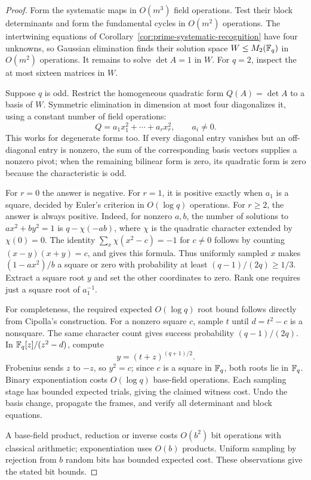 \begin{proof}
Form the systematic maps in \(O(m^3)\) field operations.  Test their block
determinants and form the fundamental cycles in \(O(m^2)\) operations.
The intertwining equations of Corollary~\ref{cor:prime-systematic-recognition}
have four unknowns, so Gaussian elimination finds their solution space
\(W\leq M_2(\mathbb F_q)\) in \(O(m^2)\) operations.  It remains to solve
\(\det A=1\) in \(W\).  For \(q=2\), inspect the at most sixteen matrices
in \(W\).

Suppose \(q\) is odd.  Restrict the homogeneous quadratic form
\(Q(A)=\det A\) to a basis of \(W\).  Symmetric elimination in dimension
at most four diagonalizes it, using a constant number of field operations:
\[
 Q= a_1x_1^2+\cdots+a_rx_r^2,\qquad a_i\ne0.
\]
This works for degenerate forms too.  If every diagonal entry vanishes but
an off-diagonal entry is nonzero, the sum of the corresponding basis
vectors supplies a nonzero pivot; when the remaining bilinear form is zero,
its quadratic form is zero because the characteristic is odd.

For \(r=0\) the answer is negative.  For \(r=1\), it is positive exactly
when \(a_1\) is a square, decided by Euler's criterion in \(O(\log q)\)
operations.  For \(r\geq2\), the answer is always positive.  Indeed, for
nonzero \(a,b\), the number of solutions to \(ax^2+by^2=1\) is
\(q-\chi(-ab)\), where \(\chi\) is the quadratic character extended by
\(\chi(0)=0\).  The identity
\(\sum_x\chi(x^2-c)=-1\) for \(c\ne0\) follows by counting
\((x-y)(x+y)=c\), and gives this formula.  Thus uniformly sampled \(x\)
makes \((1-ax^2)/b\) a square or zero with probability at least
\((q-1)/(2q)\geq1/3\).  Extract a square root \(y\) and set the other
coordinates to zero.  Rank one requires just a square root of \(a_1^{-1}\).

For completeness, the required expected \(O(\log q)\) root bound follows
directly from Cipolla's construction.  For a nonzero square \(c\), sample
\(t\) until \(d=t^2-c\) is a nonsquare.  The same character count gives
success probability \((q-1)/(2q)\).  In \(\mathbb F_q[z]/(z^2-d)\), compute
\[
 y=(t+z)^{(q+1)/2}.
\]
Frobenius sends \(z\) to \(-z\), so \(y^2=c\); since \(c\) is a square
in \(\mathbb F_q\), both roots lie in \(\mathbb F_q\).  Binary exponentiation costs
\(O(\log q)\) base-field operations.  Each sampling stage has bounded
expected trials, giving the claimed witness cost.  Undo the basis change,
propagate the frames, and verify all determinant and block equations.

A base-field product, reduction or inverse costs \(O(b^2)\) bit operations
with classical arithmetic; exponentiation uses \(O(b)\) products.  Uniform
sampling by rejection from \(b\) random bits has bounded expected cost.
These observations give the stated bit bounds.
\end{proof}

